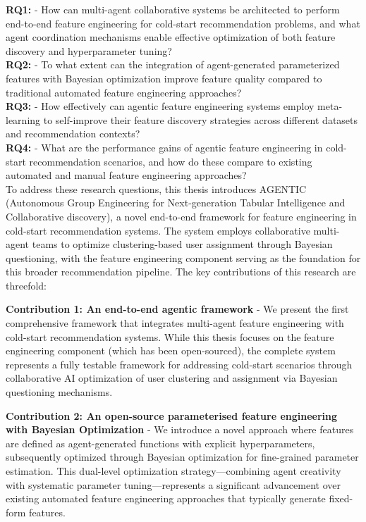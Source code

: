 \textbf{RQ1:} - How can multi-agent collaborative systems be architected to perform end-to-end feature engineering for cold-start recommendation problems, and what agent coordination mechanisms enable effective optimization of both feature discovery and hyperparameter tuning?\\
\textbf{RQ2:} - To what extent can the integration of agent-generated parameterized features with Bayesian optimization improve feature quality compared to traditional automated feature engineering approaches?\\
\textbf{RQ3:} - How effectively can agentic feature engineering systems employ meta-learning to self-improve their feature discovery strategies across different datasets and recommendation contexts?\\
\textbf{RQ4:} - What are the performance gains of agentic feature engineering in cold-start recommendation scenarios, and how do these compare to existing automated and manual feature engineering approaches?\\

To address these research questions, this thesis introduces AGENTIC (Autonomous Group Engineering for Next-generation Tabular Intelligence and Collaborative discovery), a novel end-to-end framework for feature engineering in cold-start recommendation systems. The system employs collaborative multi-agent teams to optimize clustering-based user assignment through Bayesian questioning, with the feature engineering component serving as the foundation for this broader recommendation pipeline. The key contributions of this research are threefold:

\textbf{Contribution 1: An end-to-end agentic framework} - We present the first comprehensive framework that integrates multi-agent feature engineering with cold-start recommendation systems. While this thesis focuses on the feature engineering component (which has been open-sourced), the complete system represents a fully testable framework for addressing cold-start scenarios through collaborative AI optimization of user clustering and assignment via Bayesian questioning mechanisms.

\textbf{Contribution 2: An open-source parameterised feature engineering with Bayesian Optimization} - We introduce a novel approach where features are defined as agent-generated functions with explicit hyperparameters, subsequently optimized through Bayesian optimization for fine-grained parameter estimation. This dual-level optimization strategy—combining agent creativity with systematic parameter tuning—represents a significant advancement over existing automated feature engineering approaches that typically generate fixed-form features.

